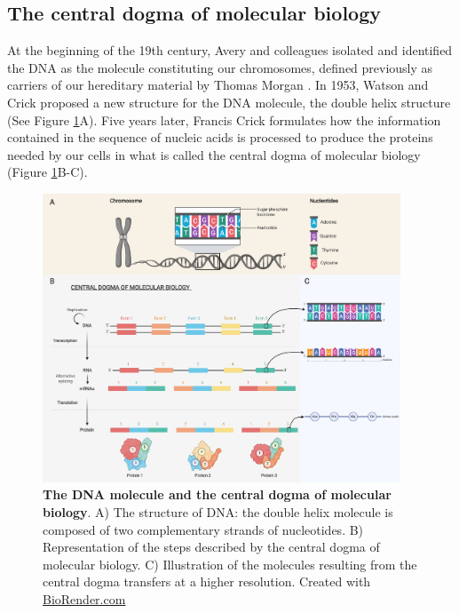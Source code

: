 \subsection{The central dogma of molecular biology}

At the beginning of the 19th century, Avery and colleagues isolated and identified the \gls{DNA} as the molecule constituting our chromosomes, defined previously as carriers of our hereditary material by Thomas Morgan \cite{Avery1944,Morgan}. In 1953, Watson and Crick proposed a new structure for the \gls*{DNA} molecule, the double helix structure \cite{Watson1953} (See Figure \ref{fig:intro_fig1}A). Five years later, Francis Crick formulates how the information contained in the sequence of nucleic acids is processed to produce the proteins needed by our cells in what is called the central dogma of molecular biology (Figure \ref{fig:intro_fig1}B-C). 
\begin{figure}[H]
    \centering
    \includegraphics[width=0.95\textwidth]{Figures/Intro/Fig_1.pdf}
    \caption[The DNA molecule and the central dogma of molecular biology]{\textbf{The \gls*{DNA} molecule and the central dogma of molecular biology}. A) The structure of \gls*{DNA}: the double helix molecule is composed of two complementary strands of nucleotides. B) Representation of the steps described by the central dogma of molecular biology. C) Illustration of the molecules resulting from the central dogma transfers at a higher resolution. Created with \href{https://biorender.com/}{BioRender.com}}
    \label{fig:intro_fig1}
\end{figure}
